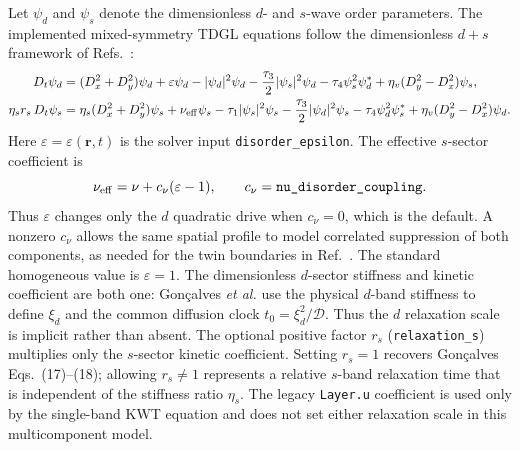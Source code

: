 \documentclass[11pt]{article}
\begin{document}
Let $\psi_d$ and $\psi_s$ denote the dimensionless $d$- and $s$-wave order
parameters.  The implemented mixed-symmetry TDGL equations follow the
dimensionless $d+s$ framework of Refs.~\cite{Goncalves2014,Zhu1999}:
\begin{align}
    D_t\psi_d={}&(D_x^2+D_y^2)\psi_d
      +\varepsilon\psi_d-|\psi_d|^2\psi_d
      -\frac{\tau_3}{2}|\psi_s|^2\psi_d
      -\tau_4\psi_s^2\psi_d^*
      +\eta_v(D_y^2-D_x^2)\psi_s,
    \label{eq:sd-d}\\
    \eta_s r_s\,D_t\psi_s={}&\eta_s(D_x^2+D_y^2)\psi_s
      +\nu_{\rm eff}\psi_s-\tau_1|\psi_s|^2\psi_s
      -\frac{\tau_3}{2}|\psi_d|^2\psi_s
      -\tau_4\psi_d^2\psi_s^*
      +\eta_v(D_y^2-D_x^2)\psi_d.
    \label{eq:sd-s}
\end{align}
Here $\varepsilon=\varepsilon(\mathbf r,t)$ is the solver input
\texttt{disorder\_epsilon}.  The effective $s$-sector coefficient is
\begin{equation}
    \nu_{\rm eff}=\nu+c_\nu(\varepsilon-1),
    \qquad c_\nu=\texttt{nu\_disorder\_coupling}.
    \label{eq:sd-nu-effective}
\end{equation}
Thus $\varepsilon$ changes only the $d$ quadratic drive when $c_\nu=0$, which
is the default.  A nonzero $c_\nu$ allows the same spatial profile to model
correlated suppression of both components, as needed for the twin boundaries
in Ref.~\cite{Li1999}.  The standard homogeneous value is $\varepsilon=1$.
The dimensionless $d$-sector stiffness and kinetic coefficient are both one:
Gon\c{c}alves \textit{et al.} use the physical $d$-band stiffness to define
$\xi_d$ and the common diffusion clock $t_0=\xi_d^2/\mathcal D$.  Thus the
$d$ relaxation scale is implicit rather than absent.  The optional positive
factor $r_s$ (\texttt{relaxation\_s}) multiplies only the $s$-sector kinetic
coefficient.  Setting $r_s=1$ recovers Gon\c{c}alves Eqs.~(17)--(18); allowing
$r_s\ne1$ represents a relative $s$-band relaxation time that is independent
of the stiffness ratio $\eta_s$.  The legacy \texttt{Layer.u} coefficient is
used only by the single-band KWT equation and does not set either relaxation
scale in this multicomponent model.
\end{document}
